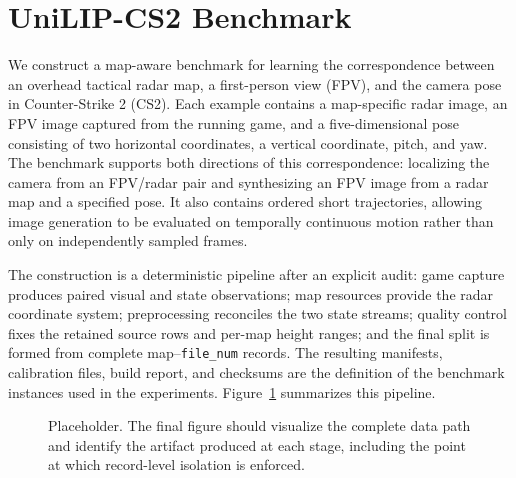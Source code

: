 \section{UniLIP-CS2 Benchmark}
\label{sec:benchmark}

We construct a map-aware benchmark for learning the correspondence between
an overhead tactical radar map, a first-person view (FPV), and the camera
pose in Counter-Strike 2 (CS2).  Each example contains a map-specific radar
image, an FPV image captured from the running game, and a five-dimensional
pose consisting of two horizontal coordinates, a vertical coordinate, pitch,
and yaw.  The benchmark supports both directions of this correspondence:
localizing the camera from an FPV/radar pair and synthesizing an FPV image
from a radar map and a specified pose.  It also contains ordered short
trajectories, allowing image generation to be evaluated on temporally
continuous motion rather than only on independently sampled frames.

The construction is a deterministic pipeline after an explicit audit: game
capture produces paired visual and state observations; map resources provide
the radar coordinate system; preprocessing reconciles the two state streams;
quality control fixes the retained source rows and per-map height ranges; and
the final split is formed from complete map--\texttt{file\_num} records.  The
resulting manifests, calibration files, build report, and checksums are the
definition of the benchmark instances used in the experiments.
Figure~\ref{fig:cs2-benchmark-pipeline} summarizes this pipeline.

\begin{figure}[t]
    \centering
    \caption{Placeholder.  The final figure should visualize the complete
    data path and identify the artifact produced at each stage, including
    the point at which record-level isolation is enforced.}
    \label{fig:cs2-benchmark-pipeline}
\end{figure}

